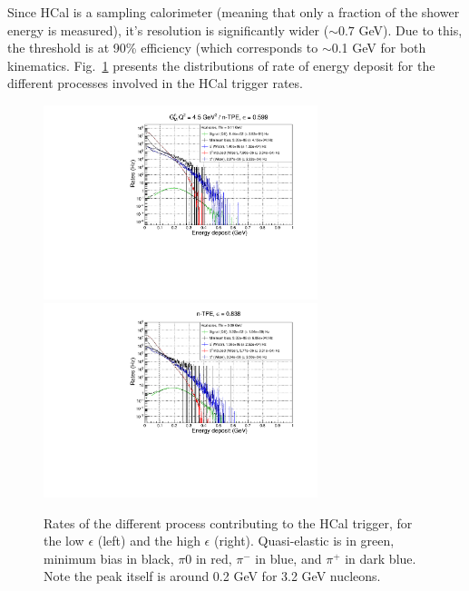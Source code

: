 Since HCal is a sampling calorimeter (meaning that only a fraction of the shower energy is measured), it's resolution is significantly wider ($\sim0.7$ GeV).
Due to this, the threshold is at 90\% efficiency (which corresponds to $\sim$0.1 GeV for both kinematics.
Fig.~\ref{fig:HCalRates} presents the distributions of rate of energy deposit for the different processes involved in the HCal trigger rates.
\begin{figure}[h]
  \centering
    \includegraphics[width=8cm]{Plots/HCalRates_gen-tpe_le.pdf}
    \includegraphics[width=8cm]{Plots/HCalRates_gen-tpe_he.pdf}
    \caption{Rates of the different process contributing to the HCal trigger, for the low $\epsilon$ (left) and the high $\epsilon$ (right). Quasi-elastic is in green, minimum bias in black, $\pi0$ in red, $\pi^-$ in blue, and $\pi^+$ in dark blue. Note the peak itself is around 0.2 GeV for 3.2 GeV nucleons.}
    \label{fig:HCalRates}
\end{figure}

